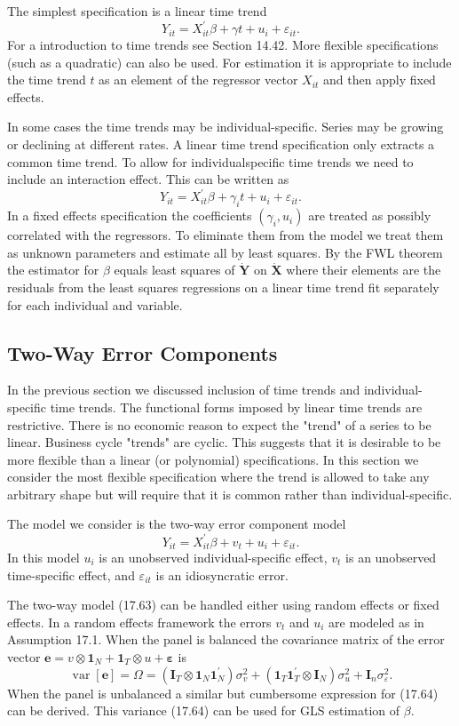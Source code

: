 \documentclass[10pt]{article}
\begin{document}
The simplest specification is a linear time trend
$$
Y_{i t}=X_{i t}^{\prime} \beta+\gamma t+u_{i}+\varepsilon_{i t} .
$$
For a introduction to time trends see Section 14.42. More flexible specifications (such as a quadratic) can also be used. For estimation it is appropriate to include the time trend $t$ as an element of the regressor vector $X_{i t}$ and then apply fixed effects.

In some cases the time trends may be individual-specific. Series may be growing or declining at different rates. A linear time trend specification only extracts a common time trend. To allow for individualspecific time trends we need to include an interaction effect. This can be written as
$$
Y_{i t}=X_{i t}^{\prime} \beta+\gamma_{i} t+u_{i}+\varepsilon_{i t} .
$$
In a fixed effects specification the coefficients $\left(\gamma_{i}, u_{i}\right)$ are treated as possibly correlated with the regressors. To eliminate them from the model we treat them as unknown parameters and estimate all by least squares. By the FWL theorem the estimator for $\beta$ equals least squares of $\dot{\boldsymbol{Y}}$ on $\dot{\boldsymbol{X}}$ where their elements are the residuals from the least squares regressions on a linear time trend fit separately for each individual and variable.

\subsection{Two-Way Error Components}
In the previous section we discussed inclusion of time trends and individual-specific time trends. The functional forms imposed by linear time trends are restrictive. There is no economic reason to expect the "trend" of a series to be linear. Business cycle "trends" are cyclic. This suggests that it is desirable to be more flexible than a linear (or polynomial) specifications. In this section we consider the most flexible specification where the trend is allowed to take any arbitrary shape but will require that it is common rather than individual-specific.

The model we consider is the two-way error component model
$$
Y_{i t}=X_{i t}^{\prime} \beta+v_{t}+u_{i}+\varepsilon_{i t} .
$$
In this model $u_{i}$ is an unobserved individual-specific effect, $v_{t}$ is an unobserved time-specific effect, and $\varepsilon_{i t}$ is an idiosyncratic error.

The two-way model (17.63) can be handled either using random effects or fixed effects. In a random effects framework the errors $v_{t}$ and $u_{i}$ are modeled as in Assumption 17.1. When the panel is balanced the covariance matrix of the error vector $\boldsymbol{e}=v \otimes \mathbf{1}_{N}+\mathbf{1}_{T} \otimes u+\boldsymbol{\varepsilon}$ is
$$
\operatorname{var}[\boldsymbol{e}]=\Omega=\left(\boldsymbol{I}_{T} \otimes \mathbf{1}_{N} \mathbf{1}_{N}^{\prime}\right) \sigma_{v}^{2}+\left(\mathbf{1}_{T} \mathbf{1}_{T}^{\prime} \otimes \boldsymbol{I}_{N}\right) \sigma_{u}^{2}+\boldsymbol{I}_{n} \sigma_{\varepsilon}^{2} .
$$
When the panel is unbalanced a similar but cumbersome expression for (17.64) can be derived. This variance (17.64) can be used for GLS estimation of $\beta$.
\end{document}
